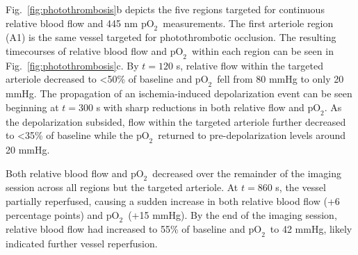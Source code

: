 \documentclass[12pt]{spieman}  %
\newcommand{\pO}{\ensuremath{\text{pO}_2}} 	            %
\begin{document}
\begin{spacing}{2}
Fig.~\ref{fig:photothrombosis}b depicts the five regions targeted for continuous relative blood flow and 445 nm \pO\ measurements. The first arteriole region (A1) is the same vessel targeted for photothrombotic occlusion. The resulting timecourses of relative blood flow and \pO\ within each region can be seen in Fig.~\ref{fig:photothrombosis}c. By $t = 120$ s, relative flow within the targeted arteriole decreased to \textless50\% of baseline and \pO\ fell from 80 mmHg to only 20 mmHg. The propagation of an ischemia-induced depolarization event \cite{Shin:2006dc,Dreier:2011gz} can be seen beginning at $t = 300$ s with sharp reductions in both relative flow and \pO. As the depolarization subsided, flow within the targeted arteriole further decreased to \textless35\% of baseline while the \pO\ returned to pre-depolarization levels around 20 mmHg.

Both relative blood flow and \pO\ decreased over the remainder of the imaging session across all regions but the targeted arteriole. At $t = 860$ s, the vessel partially reperfused, causing a sudden increase in both relative blood flow (+6 percentage points) and \pO\ (+15 mmHg). By the end of the imaging session, relative blood flow had increased to 55\% of baseline and \pO\ to 42 mmHg, likely indicated further vessel reperfusion.


\end{spacing}
\end{document}

